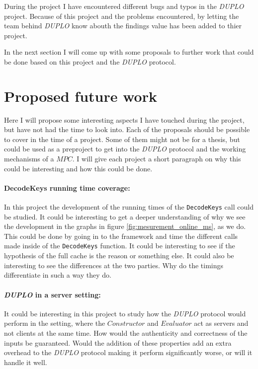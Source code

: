 \documentclass[twoside,11pt,openright]{report}
\newcommand{\DUPLO}{\textit{DUPLO} }
\begin{document}
\bigskip

During the project I have encountered different bugs and typos in the \DUPLO project. Because of this project and the problems encountered, by letting the team behind \DUPLO know abouth the findings value has been added to thier project.

\bigskip

In the next section I will come up with some proposals to further work that could be done based on this project and the \DUPLO protocol.

\section{Proposed future work}
Here I will propose some interesting aspects I have touched during the project, but have not had the time to look into. Each of the proposals should be possible to cover in the time of a project. Some of them might not be for a thesis, but could be used as a preproject to get into the \DUPLO protocol and the working mechanisms of a $MPC$. I will give each project a short paragraph on why this could be interesting and how this could be done.

\paragraph{DecodeKeys running time coverage:}
In this project the development of the running times of the \verb|DecodeKeys| call could be studied. It could be interesting to get a deeper understanding of why we see the development in the graphs in figure \ref{fig:mesurement_online_ms}, as we do. This could be done by going in to the framework and time the different calls made inside of the \verb|DecodeKeys| function. It could be interesting to see if the hypothesis of the full cache is the reason or something else. It could also be interesting to see the differences at the two parties. Why do the timings differentiate in such a way they do.

\paragraph{\DUPLO in a server setting:}
It could be interesting in this project to study how the \DUPLO protocol would perform in the setting, where the $Constructor$ and $Evaluator$ act as servers and not clients at the same time. How would the authenticity and correctness of the inputs be guaranteed. Would the addition of these properties add an extra overhead to the \DUPLO protocol making it perform significantly worse, or will it handle it well. 
\end{document}
